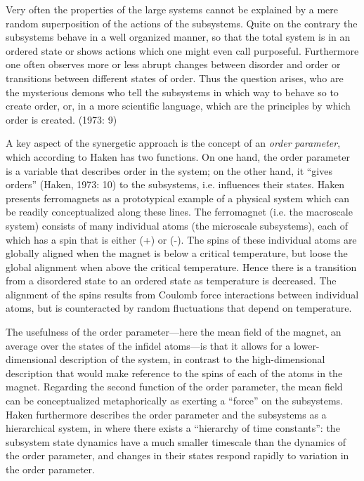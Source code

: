 Very often the properties of the large systems cannot be explained by a mere random superposition of the actions of the subsystems. Quite on the contrary the subsystems behave in a well organized manner, so that the total system is in an ordered state or shows actions which one might even call purposeful. Furthermore one often observes more or less abrupt changes between disorder and order or transitions between different states of order. Thus the question arises, who are the mysterious demons who tell the subsystems in which way to behave so to create order, or, in a more scientific language, which are the principles by which order is created. (1973: 9)

A key aspect of the synergetic approach is the concept of an \textit{order} \textit{parameter}, which according to Haken has two functions. On one hand, the order parameter is a variable that describes order in the system; on the other hand, it “gives orders” (Haken, 1973: 10) to the subsystems, i.e. influences their states. Haken presents ferromagnets as a prototypical example of a physical system which can be readily conceptualized along these lines. The ferromagnet (i.e. the macroscale system) consists of many individual atoms (the microscale subsystems), each of which has a spin that is either (+) or (-). The spins of these individual atoms are globally aligned when the magnet is below a critical temperature, but loose the global alignment when above the critical temperature. Hence there is a transition from a disordered state to an ordered state as temperature is decreased. The alignment of the spins results from Coulomb force interactions between individual atoms, but is counteracted by random fluctuations that depend on temperature. 

The usefulness of the order parameter—here the mean field of the magnet, an average over the states of the infidel atoms—is that it allows for a lower-dimensional description of the system, in contrast to the high-dimensional description that would make reference to the spins of each of the atoms in the magnet. Regarding the second function of the order parameter, the mean field can be conceptualized metaphorically as exerting a “force” on the subsystems. Haken furthermore describes the order parameter and the subsystems as a hierarchical system, in where there exists a “hierarchy of time constants”: the subsystem state dynamics have a much smaller timescale than the dynamics of the order parameter, and changes in their states respond rapidly to variation in the order parameter. 

